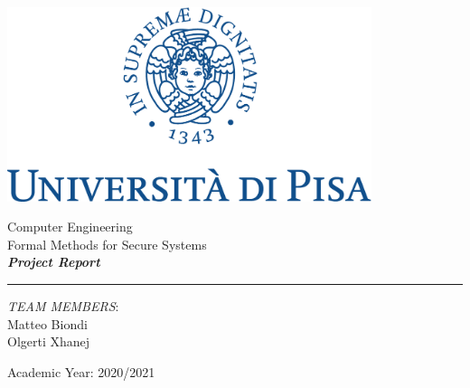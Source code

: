 \documentclass[12pt]{article}
\begin{document}
	
	
	\begin{titlepage}
		\begin{center}
			
			\begin{center}
				\includegraphics[width=0.8\textwidth]{img/marchio_unipi_pant541-eps-converted-to.pdf}         
			\end{center}
			{\Large
				\vspace{15mm}
				Computer Engineering\\
				\vspace{5mm}
				Formal Methods for Secure Systems}\\
			\vspace{30mm} 
			{\Huge\textbf{\textit{Project Report}}}\\
			\vspace{70mm} 
			\par\noindent\rule{\textwidth}{0.4pt}
			\begin{flushright}
				\textit{TEAM MEMBERS}:\\
				Matteo Biondi\\
				Olgerti Xhanej\\
			\end{flushright}
			\vfill
			Academic Year: 2020/2021\\        
		\end{center}
	\end{titlepage} 
	\tableofcontents
	
	
		
	
	
	
\end{document}
